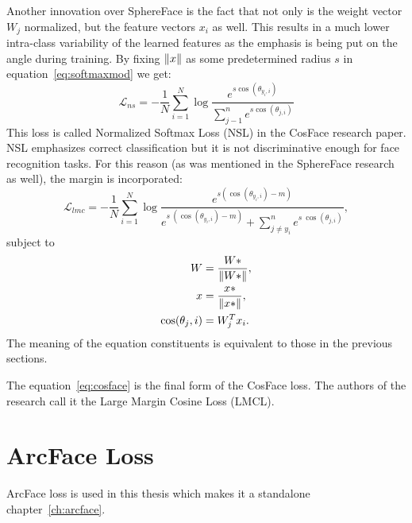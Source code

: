 Another innovation over SphereFace is the fact that not only is the weight vector $W_j$ normalized, but the feature
vectors $x_i$ as well.
This results in a much lower intra-class variability of the learned features as the emphasis is being put on the
angle during training.
By fixing $\left\lVert x\right\rVert$ as some predetermined radius $s$ in equation~\ref{eq:softmaxmod} we get:
\begin{equation}
    \mathcal{L}_{ns} = -\frac{1}{N} \sum_{i=1}^{N} \log \frac{e^{s \cos(\theta_{y_i,i})}}
    {\sum_{j-1}^{n} e^{s \cos(\theta_{j,i})}}
\end{equation}
This loss is called Normalized Softmax Loss (NSL) in the CosFace research paper.
NSL emphasizes correct classification but it is not discriminative enough for face recognition tasks.
For this reason (as was mentioned in the SphereFace research as well), the margin is incorporated:
\begin{equation}
    \label{eq:cosface}
    \mathcal{L}_{lmc} = -\frac{1}{N} \sum_{i=1}^{N} \log \frac{e^{s \left( \cos(\theta_{y_i,i}) - m \right)}}
    {e^{s\ \left( \cos(\theta_{y_i,i}) - m \right)} + \sum_{j \neq y_i}^n e^{s\ \cos(\theta_{j,i})}},
\end{equation}
subject to
\begin{align}
    W &= \frac{W*}{\left\lVert W*\right\rVert}, \\
    x &= \frac{x*}{\left\lVert x*\right\rVert}, \\
    \cos(\theta_j, i) &= W_{j}^T x_i.
\end{align}
The meaning of the equation constituents is equivalent to those in the previous sections.

The equation~\ref{eq:cosface} is the final form of the CosFace loss.
The authors of the research call it the Large Margin Cosine Loss (LMCL).

\section{ArcFace Loss}\label{sec:arcface}
ArcFace loss is used in this thesis which makes it a standalone chapter~\ref{ch:arcface}.